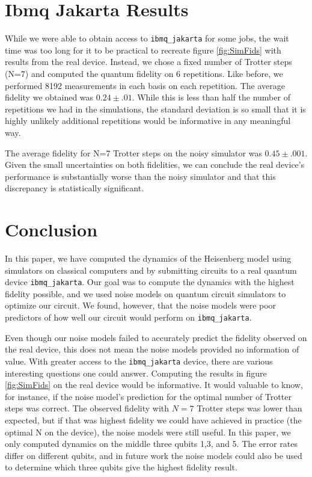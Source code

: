 \documentclass[aps,prl, reprint]{revtex4-2}
\begin{document}
\section{Ibmq Jakarta Results}

While we were able to obtain access to \texttt{ibmq\_jakarta} for some jobs, the wait time was too long for it to be practical to recreate figure \ref{fig:SimFids} with results from the real device. Instead, we chose a fixed number of Trotter steps (N=7) and computed the quantum fidelity on 6 repetitions. Like before, we performed 8192 measurements in each basis on each repetition. The average fidelity we obtained was $0.24 \pm .01$. While this is less than half the number of repetitions we had in the simulations, the standard deviation is so small that it is highly unlikely additional repetitions would be informative in any meaningful way.

The average fidelity for N=7 Trotter steps on the noisy simulator was $0.45 \pm .001$. Given the small uncertainties on both fidelities, we can conclude the real device's performance is substantially worse than the noisy simulator and that this discrepancy is statistically significant.\\

\section{Conclusion}

In this paper, we have computed the dynamics of the Heisenberg model using simulators on classical computers and by submitting circuits to a real quantum device \texttt{ibmq\_jakarta}. Our goal was to compute the dynamics with the highest fidelity possible, and we used noise models on quantum circuit simulators to optimize our circuit. We found, however, that the noise models were poor predictors of how well our circuit would perform on \texttt{ibmq\_jakarta}.

Even though our noise models failed to accurately predict the fidelity observed on the real device, this does not mean the noise models provided no information of value. With greater access to the \texttt{ibmq\_jakarta} device, there are various interesting questions one could answer. Computing the results in figure \ref{fig:SimFids} on the real device would be informative. It would valuable to know, for instance, if the noise model's prediction for the optimal number of Trotter steps was correct. The observed fidelity with $N=7$ Trotter steps was lower than expected, but if that was highest fidelity we could have achieved in practice (the optimal N on the device), the noise models were still useful. In this paper, we only computed dynamics on the middle three qubits 1,3, and 5. The error rates differ on different qubits, and in future work the noise models could also be used to determine which three qubits give the highest fidelity result.
\end{document}
